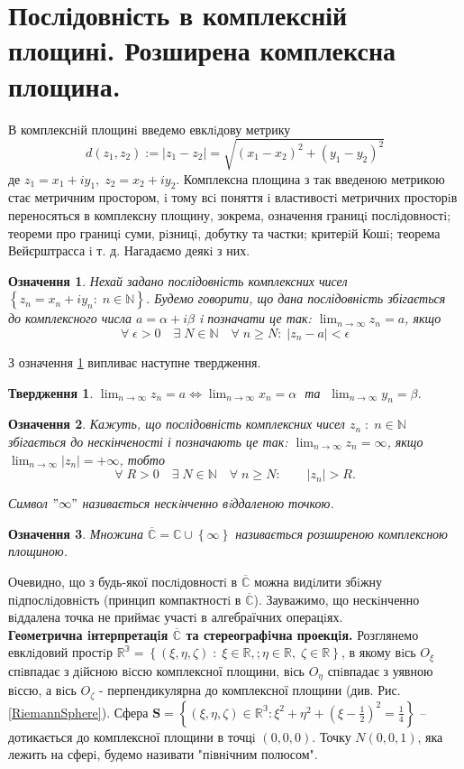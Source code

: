 \documentclass[10pt]{report} %
\let\oldlim\lim
\renewcommand{\lim}{\displaystyle\oldlim}
\let\oldforall\forall
\renewcommand{\forall}{\oldforall\;}
\let\oldexists\exists
\renewcommand{\exists}{\oldexists\;}
\newtheorem{definition}{Означення}[section]
\newtheorem{proposition}{Твердження}[section]
\begin{document}
\section{Послідовність в комплексній площині. Розширена комплексна площина.}
В комплекснiй площинi введемо евклiдову метрику
\[d(z_1,z_2):=|z_1-z_2|=\sqrt{{(x_1-x_2)}^2+{(y_1-y_2)}^2}\]
де $z_1=x_1+iy_1,\;z_2=x_2+iy_2$. Комплексна площина з так введеною метрикою стає
метричним простором, i тому всi поняття i властивостi метричних просторiв переносяться в комплексну площину, зокрема, означення границi
 послiдовностi; теореми про границi суми, рiзницi, добутку та частки; критерiй Кошi; теорема Вейєрштрасса i т. д. Нагадаємо деякi з них.\\
\begin{definition}\label{ComplexConvergenceDef}
Нехай задано послідовність комплексних чисел $\left\{z_n=x_n+iy_n:\;n\in\mathbb{N}\right\}$. Будемо говорити, що дана послідовність 
збігається до комплексного числа $a=\alpha+i\beta$ i позначати це так: $\lim_{n\to\infty}z_n=a$, якщо
\[\forall \epsilon>0\quad\exists N\in\mathbb{N}\quad\forall n\geq N:\; |z_n-a|<\epsilon\]
\end{definition}

З означення \ref{ComplexConvergenceDef} випливає наступне твердження. 
\begin{proposition}$\lim_{n\to\infty}z_n=a\iff \lim_{n\to\infty}x_n=\alpha\;$ та $\;\lim_{n\to\infty}y_n=\beta$.\end{proposition}
\begin{definition}Кажуть, що послідовність комплексних чисел ${z_n\;:\;n\in\mathbb{N}}$ збігається до нескінченості і
 позначають це так: $\lim_{n\to\infty}z_n = \infty$, якщо $\lim_{n\to\infty} |z_n| = +\infty$, тобто
\[\forall R>0\quad \exists N\in\mathbb{N}\quad \forall n\geq N:\qquad |z_n|>R.\]

Символ $"\infty"$ називається нескiнченно вiддаленою точкою.
\end{definition}
\begin{definition}
Множина $\overline{\mathbb{C}} = \mathbb{C}\cup\left\{\infty\right\}$ називається розширеною комплексною площиною.
\end{definition}

Очевидно, що з будь-якої послiдовностi в $\overline{\mathbb{C}}$ можна видiлити збiжну пiдпослiдовнiсть (принцип компактностi в 
$\overline{\mathbb{C}}$). Зауважимо, що нескiнченно вiддалена точка не приймає участi в алгебраїчних операцiях.\\
\textbf{Геометрична iнтерпретацiя $\overline{\mathbb{C}}$ та стереографiчна проекцiя.} Розглянемо евклiдовий простiр 
$\mathbb{R^3} = \left\{(\xi, \eta, \zeta)\;:\;\xi\in\mathbb{R},;\eta\in \mathbb{R},\;\zeta\in \mathbb{R}\right\}$, в якому вiсь $O_{\xi}$ 
спiвпадає з дiйсною вiссю комплексної площини, вiсь $O_{\eta}$ спiвпадає з уявною вiссю, а вiсь $O_{\zeta}$ - перпендикулярна до комплексної
 площини (див. Рис. \ref{RiemannSphere}). Сфера $\mathbf{S} =\left\{(\xi, \eta, \zeta)\in \mathbb{R^3} : \xi^2 + \eta^2 + 
{\left(\xi-\frac{1}{2}\right)}^2 =\frac{1}{4}\right\}$ -- дотикається до комплексної площини в точцi
$(0, 0, 0)$. Точку $N(0, 0, 1)$, яка лежить на сферi, будемо називати "пiвнiчним полюсом".
\end{document}
